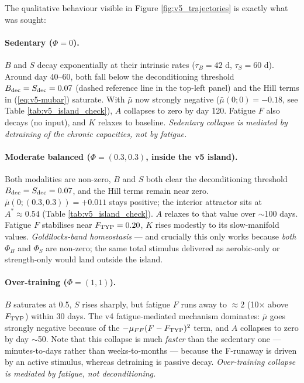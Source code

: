 The qualitative behaviour visible in Figure \ref{fig:v5_trajectories} is exactly what was sought:

\paragraph{Sedentary ($\Phi=0$).} $B$ and $S$ decay exponentially at their intrinsic rates ($\tau_B = 42$ d, $\tau_S = 60$ d). Around day 40--60, both fall below the deconditioning threshold $B_{\rm dec} = S_{\rm dec} = 0.07$ (dashed reference line in the top-left panel) and the Hill terms in (\ref{eq:v5-mubar}) saturate. With $\bar\mu$ now strongly negative ($\bar\mu(0;0) = -0.18$, see Table \ref{tab:v5_island_check}), $A$ collapses to zero by day 120. Fatigue $F$ also decays (no input), and $K$ relaxes to baseline. \emph{Sedentary collapse is mediated by detraining of the chronic capacities, not by fatigue.}

\paragraph{Moderate balanced ($\Phi=(0.3, 0.3)$, inside the v5 island).} Both modalities are non-zero, $B$ and $S$ both clear the deconditioning threshold $B_{\rm dec} = S_{\rm dec} = 0.07$, and the Hill terms remain near zero. $\bar\mu(0; (0.3, 0.3)) = +0.011$ stays positive; the interior attractor sits at $A^* \approx 0.54$ (Table \ref{tab:v5_island_check}). $A$ relaxes to that value over $\sim$100 days. Fatigue $F$ stabilises near $F_{\rm TYP} = 0.20$, $K$ rises modestly to its slow-manifold values. \emph{Goldilocks-band homeostasis} --- and crucially this only works because \emph{both} $\Phi_B$ and $\Phi_S$ are non-zero; the same total stimulus delivered as aerobic-only or strength-only would land outside the island.

\paragraph{Over-training ($\Phi=(1,1)$).} $B$ saturates at 0.5, $S$ rises sharply, but fatigue $F$ runs away to $\approx 2$ (10$\times$ above $F_{\rm TYP}$) within 30 days. The v4 fatigue-mediated mechanism dominates: $\bar\mu$ goes strongly negative because of the $-\mu_{FF}(F-F_{\rm TYP})^2$ term, and $A$ collapses to zero by day $\sim$50. Note that this collapse is much \emph{faster} than the sedentary one --- minutes-to-days rather than weeks-to-months --- because the F-runaway is driven by an active stimulus, whereas detraining is passive decay. \emph{Over-training collapse is mediated by fatigue, not deconditioning.}

